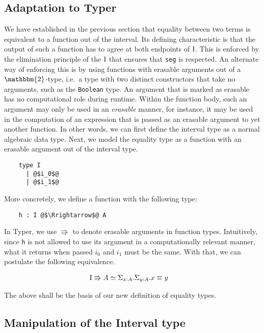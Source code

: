 \documentclass[12pt,twoside,maitrise]{dms}
\theoremstyle{definition}
\numberwithin{equation}{section}
\numberwithin{table}{chapter}
\numberwithin{figure}{chapter}
\newcommand\id[1] {\texttt{#1}}
\begin{document}
\subsection{Adaptation to Typer}\label{sec:eq-justification}
We have established in the previous section that equality between two terms is
equivalent to a function out of the interval. Its defining characteristic is
that the output of such a function has to agree at both endpoints of $\mathrm{I}$. This
is enforced by the elimination principle of the $\mathrm{I}$ that ensures that \id{seg}
is respected. An alternate way of enforcing this is by using functions with
erasable arguments out of a $\mathbbm{2}$-type, i.e.\ a type with two distinct
constructors that take no arguments, such as the \id{Boolean} type. An argument
that is marked as erasable has no computational role during runtime. Within the
function body, such an argument may only be used in an \emph{erasable} manner,
for instance, it may be used in the computation of an expression that is passed
as an erasable argument to yet another function. In other words, we can first
define the interval type as a normal algebraic data type. Next, we model the
equality type as a function with an erasable argument out of the interval type.

\begin{verbatim}
    type I
      | @$i_0$@
      | @$i_1$@
\end{verbatim}

More concretely, we define a function with the following type:

\begin{verbatim}
    h : I @$\Rrightarrow$@ A
\end{verbatim}

In Typer, we use $\Rrightarrow$ to denote erasable arguments in function types.
Intuitively, since \id{h} is not allowed to use its argument in a
computationally relevant manner, what it returns when passed $i_0$ and $i_1$
must be the same. With that, we can postulate the following equivalence.

\begin{align*}
  & \bI \Rrightarrow A \simeq \Sigma_{\oftype{x}{A}} . \Sigma_{\oftype{y}{A}} .
  \eqtype{x}{y}
\end{align*}

The above shall be the basis of our new definition of equality types.

\subsection{Manipulation of the Interval type}\label{sec:interval-manipulation}
\end{document}
